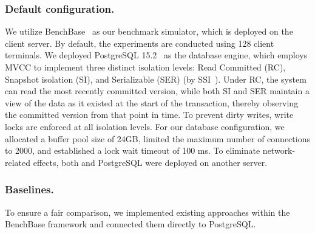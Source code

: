 \subsubsection{Default configuration.}
We utilize BenchBase~\cite{DBLP:journals/pvldb/DifallahPCC13} as our benchmark simulator, %
which is deployed on the client server. By default, the experiments are conducted using 128 client terminals.
We deployed PostgreSQL 15.2~\cite{PostgreSQL} as the database engine, which employs MVCC to implement three distinct isolation levels: Read Committed (RC), Snapshot isolation (SI), and Serializable (SER) (by SSI~\cite{DBLP:conf/sigmod/CahillRF08}). 
Under RC, the system can read the most recently committed version, while both SI and SER maintain a view of the data as it existed at the start of the transaction, thereby observing the committed version from that point in time. To prevent dirty writes, write locks are enforced at all isolation levels.
For our database configuration, we allocated a buffer pool size of 24GB, limited the maximum number of connections to 2000, and established a lock wait timeout of 100 ms. 
To eliminate network-related effects, both \sysname and PostgreSQL were deployed on another server. 


\subsubsection{Baselines.} To ensure a fair comparison, we implemented existing approaches within the BenchBase framework and connected them directly to PostgreSQL.  

